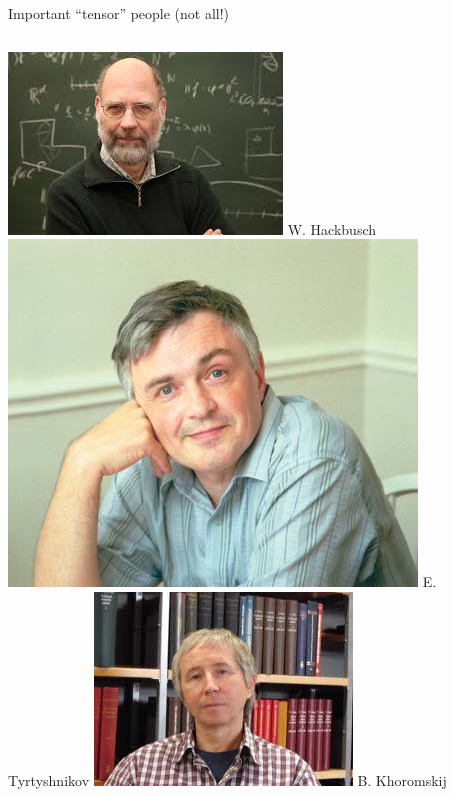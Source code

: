 \documentclass{beamer}[14pt, presentation]
\begin{document}
\begin{frame}[label=sec-1-3]{Important ``tensor'' people (not all!)}
\begin{columns}
\begin{column}{0.25\textwidth}
\includegraphics[height=0.15\textheight]{hackbusch.jpeg}
\vskip 2mm
{\small W. Hackbusch}
\vskip 2mm
\includegraphics[height=0.15\textheight]{tee1.jpg}
\vskip 2mm
{\footnotesize E. Tyrtyshnikov}
\vskip 2mm
\includegraphics[height=0.15\textheight]{khor.jpeg}
\vskip 2mm
{\footnotesize B. Khoromskij}
\end{column}


\end{columns}
\end{frame}
\end{document}
